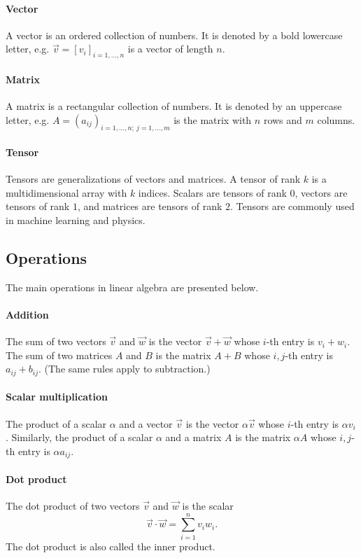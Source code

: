 \paragraph{Vector}  A vector is an ordered collection of numbers.  It is denoted by a bold
lowercase letter, e.g. $\vec{v} = [v_i]_{i= 1,\dots, n}$ is a vector of length $n$.

\paragraph{Matrix}  A matrix is a rectangular collection of numbers.  It is denoted by an
uppercase letter, e.g. $A = (a_{ij})_{i = 1, \dots, n;~j = 1, \dots, m}$ is the matrix
with $n$ rows and $m$ columns.

\paragraph{Tensor}  Tensors are generalizations of vectors and matrices.  A tensor of rank
$k$ is a multidimensional array with $k$ indices.  Scalars are tensors of rank $0$,
vectors are tensors of rank $1$, and matrices are tensors of rank $2$.  Tensors are
commonly used in machine learning and physics.

\subsection{Operations}

The main operations in linear algebra are presented below.

\paragraph{Addition}  The sum of two vectors $\vec{v}$ and $\vec{w}$ is the vector
$\vec{v} + \vec{w}$ whose $i$-th entry is $v_i + w_i$.  The sum of two matrices $A$ and
$B$ is the matrix $A + B$ whose $i, j$-th entry is $a_{ij} + b_{ij}$.  (The same rules apply
to subtraction.)

\paragraph{Scalar multiplication}  The product of a scalar $\alpha$ and a vector $\vec{v}$
is the vector $\alpha \vec{v}$ whose $i$-th entry is $\alpha v_i$.  Similarly, the product of a
scalar $\alpha$ and a matrix $A$ is the matrix $\alpha A$ whose $i, j$-th entry is
$\alpha a_{ij}$.

\paragraph{Dot product}  The dot product of two vectors $\vec{v}$ and $\vec{w}$ is the
scalar $$\vec{v} \cdot \vec{w} = \sum_{i = 1}^n v_i w_i\text{.}$$  The dot product is also called
the inner product.

